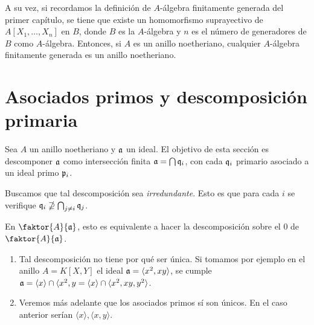 \documentclass[../main.tex]{subfiles}
\begin{document}
A su vez, si recordamos la definición de $A$-álgebra finitamente generada del primer capítulo, se tiene que existe un homomorfismo suprayectivo de $A[X_1,\dots,X_n]$ en $B$, donde $B$ es la $A$-álgebra y $n$ es el número de generadores de $B$ como $A$-álgebra. Entonces, si $A$ es un anillo noetheriano, cualquier $A$-álgebra finitamente generada es un anillo noetheriano.

\section{Asociados primos y descomposición primaria}
Sea $A$ un anillo noetheriano y $\mathfrak{a}$ un ideal. El objetivo de esta sección es descomponer $\mathfrak{a}$ como intersección finita $\mathfrak{a}=\bigcap \mathfrak{q}_i$, con cada $\mathfrak{q}_i$ primario asociado a un ideal primo $\mathfrak{p}_i$.

Buscamos que tal descomposición sea \textit{irredundante}. Esto es que para cada $i$ se verifique $\mathfrak{q}_i\nsupseteq \bigcap_{j\neq i}\mathfrak{q}_j$.

En $\faktor{A}{\af}$, esto es equivalente a hacer la descomposición sobre el $0$ de $\faktor{A}{\af}$.

\begin{remark}
\begin{enumerate}
    \item Tal descomposición no tiene por qué ser única. Si tomamos por ejemplo en el anillo $A=K[X,Y]$ el ideal $\mathfrak{a}=\langle x^2,xy\rangle$, se cumple $\mathfrak{a}=\langle x\rangle\cap\langle x^2,y=\langle x\rangle\cap\langle x^2,xy,y^2\rangle$.
    \item  Veremos más adelante que los asociados primos sí son únicos. En el caso anterior serían $\langle x\rangle, \langle x,y\rangle$.
\end{enumerate}
\end{remark}
\end{document}
